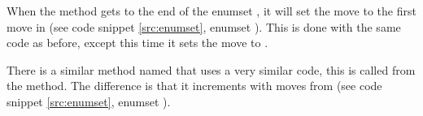 When the method gets to the end of the enumset , it will set the move to the first move in  (see code snippet \ref{src:enumset}, enumset ).
This is done with the same code as before, except this time it sets the move to .

There is a similar method named  that uses a very similar code, this is called from the  method.
The difference is that it increments with moves from  (see code snippet \ref{src:enumset}, enumset ).
